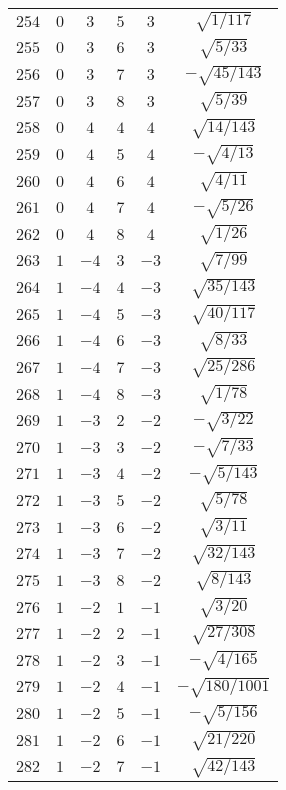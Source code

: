 \begin{table}
\begin{center}
\begin{tabular}{|c|c|c|c|c|c|}
$254$ & $0$ & $3$ & $5$ & $3$ & $\sqrt{1/117}$ \\ 
$255$ & $0$ & $3$ & $6$ & $3$ & $\sqrt{5/33}$ \\ 
$256$ & $0$ & $3$ & $7$ & $3$ & $-\sqrt{45/143}$ \\ 
$257$ & $0$ & $3$ & $8$ & $3$ & $\sqrt{5/39}$ \\ 
$258$ & $0$ & $4$ & $4$ & $4$ & $\sqrt{14/143}$ \\ 
$259$ & $0$ & $4$ & $5$ & $4$ & $-\sqrt{4/13}$ \\ 
$260$ & $0$ & $4$ & $6$ & $4$ & $\sqrt{4/11}$ \\ 
$261$ & $0$ & $4$ & $7$ & $4$ & $-\sqrt{5/26}$ \\ 
$262$ & $0$ & $4$ & $8$ & $4$ & $\sqrt{1/26}$ \\ 
$263$ & $1$ & $-4$ & $3$ & $-3$ & $\sqrt{7/99}$ \\ 
$264$ & $1$ & $-4$ & $4$ & $-3$ & $\sqrt{35/143}$ \\ 
$265$ & $1$ & $-4$ & $5$ & $-3$ & $\sqrt{40/117}$ \\ 
$266$ & $1$ & $-4$ & $6$ & $-3$ & $\sqrt{8/33}$ \\ 
$267$ & $1$ & $-4$ & $7$ & $-3$ & $\sqrt{25/286}$ \\ 
$268$ & $1$ & $-4$ & $8$ & $-3$ & $\sqrt{1/78}$ \\ 
$269$ & $1$ & $-3$ & $2$ & $-2$ & $-\sqrt{3/22}$ \\ 
$270$ & $1$ & $-3$ & $3$ & $-2$ & $-\sqrt{7/33}$ \\ 
$271$ & $1$ & $-3$ & $4$ & $-2$ & $-\sqrt{5/143}$ \\ 
$272$ & $1$ & $-3$ & $5$ & $-2$ & $\sqrt{5/78}$ \\ 
$273$ & $1$ & $-3$ & $6$ & $-2$ & $\sqrt{3/11}$ \\ 
$274$ & $1$ & $-3$ & $7$ & $-2$ & $\sqrt{32/143}$ \\ 
$275$ & $1$ & $-3$ & $8$ & $-2$ & $\sqrt{8/143}$ \\ 
$276$ & $1$ & $-2$ & $1$ & $-1$ & $\sqrt{3/20}$ \\ 
$277$ & $1$ & $-2$ & $2$ & $-1$ & $\sqrt{27/308}$ \\ 
$278$ & $1$ & $-2$ & $3$ & $-1$ & $-\sqrt{4/165}$ \\ 
$279$ & $1$ & $-2$ & $4$ & $-1$ & $-\sqrt{180/1001}$ \\ 
$280$ & $1$ & $-2$ & $5$ & $-1$ & $-\sqrt{5/156}$ \\ 
$281$ & $1$ & $-2$ & $6$ & $-1$ & $\sqrt{21/220}$ \\ 
$282$ & $1$ & $-2$ & $7$ & $-1$ & $\sqrt{42/143}$ \\ 

\end{tabular}
\end{center}
\end{table}
